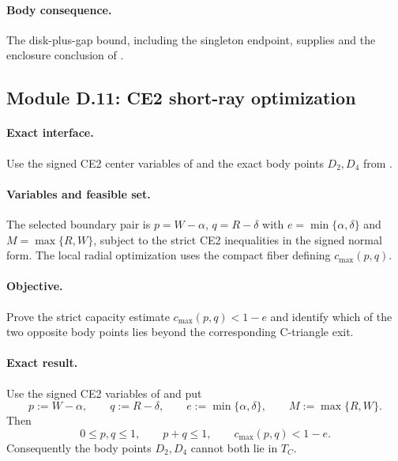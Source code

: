 \paragraph{Body consequence.}
The disk-plus-gap bound, including the singleton endpoint, supplies
 and the enclosure conclusion of
.

\subsection{Module D.11: CE2 short-ray optimization}

\paragraph{Exact interface.}
Use the signed CE2 center variables of
 and the exact body points
$D_2,D_4$ from .

\paragraph{Variables and feasible set.}
The selected boundary pair is $p=W-\alpha$, $q=R-\delta$ with
$e=\min\{\alpha,\delta\}$ and $M=\max\{R,W\}$, subject to the strict CE2
inequalities in the signed normal form.  The local radial optimization uses
the compact fiber defining $c_{\max}(p,q)$.

\paragraph{Objective.}
Prove the strict capacity estimate $c_{\max}(p,q)<1-e$ and identify which of
the two opposite body points lies beyond the corresponding C-triangle exit.

\paragraph{Exact result.}

\begin{lemma}
\label{lem:app-ce2-short-ray}
Use the signed CE2 variables of
 and put
\[
 p:=W-\alpha,\qquad q:=R-\delta,
 \qquad e:=\min\{\alpha,\delta\},
 \qquad M:=\max\{R,W\}.
\]
Then
\[
 0\le p,q\le1,\qquad p+q\le1,\qquad
 c_{\max}(p,q)<1-e.
\]
Consequently the body points $D_2,D_4$ cannot both lie in $T_C$.
\end{lemma}

